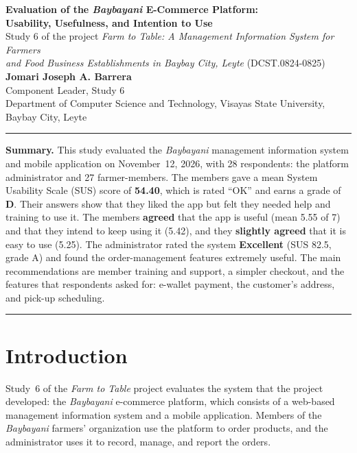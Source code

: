 \documentclass[11pt,a4paper]{article}
\begin{document}
\begin{center}
{\Large\bfseries Evaluation of the \textit{Baybayani} E-Commerce Platform:\\[2pt]
Usability, Usefulness, and Intention to Use}\\[10pt]
{\normalsize Study 6 of the project \textit{Farm to Table: A Management Information System for Farmers\\
and Food Business Establishments in Baybay City, Leyte} (DCST.0824-0825)}\\[10pt]
{\normalsize\textbf{Jomari Joseph A. Barrera}}\\
{\small Component Leader, Study 6\\
Department of Computer Science and Technology, Visayas State University, Baybay City, Leyte}
\end{center}

\vspace{4pt}
\noindent\rule{\linewidth}{0.4pt}
\begin{small}
\textbf{Summary.} This study evaluated the \textit{Baybayani} management information system and mobile application on November~12, 2026, with 28 respondents: the platform administrator and 27 farmer-members. The members gave a mean System Usability Scale (SUS) score of \textbf{54.40}, which is rated ``OK'' and earns a grade of \textbf{D}. Their answers show that they liked the app but felt they needed help and training to use it. The members \textbf{agreed} that the app is useful (mean 5.55 of 7) and that they intend to keep using it (5.42), and they \textbf{slightly agreed} that it is easy to use (5.25). The administrator rated the system \textbf{Excellent} (SUS 82.5, grade A) and found the order-management features extremely useful. The main recommendations are member training and support, a simpler checkout, and the features that respondents asked for: e-wallet payment, the customer's address, and pick-up scheduling.
\end{small}

\vspace{-2pt}
\noindent\rule{\linewidth}{0.4pt}

\section{Introduction}

Study~6 of the \textit{Farm to Table} project evaluates the system that the project developed: the \textit{Baybayani} e-commerce platform, which consists of a web-based management information system and a mobile application. Members of the \textit{Baybayani} farmers' organization use the platform to order products, and the administrator uses it to record, manage, and report the orders.
\end{document}

